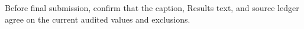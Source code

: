 Before final submission, confirm that the caption, Results text, and source ledger agree on the current audited values and exclusions.
